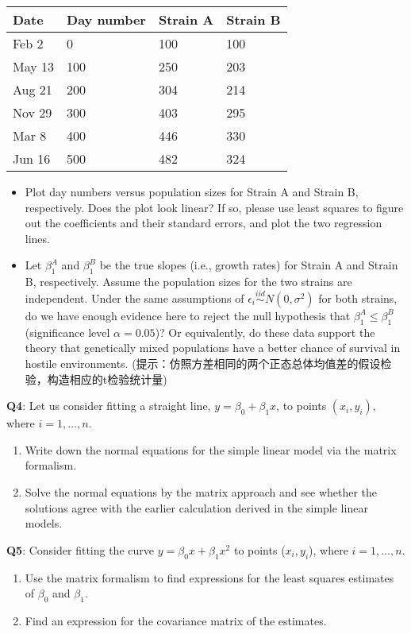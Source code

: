 \documentclass[]{article}
\begin{document}
\begin{longtable}[]{@{}llll@{}}
\toprule
Date & Day number & Strain A & Strain B\tabularnewline
\midrule
\endhead
Feb 2 & 0 & 100 & 100\tabularnewline
May 13 & 100 & 250 & 203\tabularnewline
Aug 21 & 200 & 304 & 214\tabularnewline
Nov 29 & 300 & 403 & 295\tabularnewline
Mar 8 & 400 & 446 & 330\tabularnewline
Jun 16 & 500 & 482 & 324\tabularnewline
\bottomrule
\end{longtable}

\begin{itemize}
\item
  Plot day numbers versus population sizes for Strain A and Strain B,
  respectively. Does the plot look linear? If so, please use least
  squares to figure out the coefficients and their standard errors, and
  plot the two regression lines.
\item
  Let \(\beta_1^A\) and \(\beta_1^B\) be the true slopes (i.e., growth
  rates) for Strain A and Strain B, respectively. Assume the population
  sizes for the two strains are independent. Under the same assumptions
  of \(\epsilon_i\stackrel{iid}{\sim} N(0,\sigma^2)\) for both strains,
  do we have enough evidence here to reject the null hypothesis that
  \(\beta_1^A\le \beta_1^B\) (significance level \(\alpha=0.05\))? Or
  equivalently, do these data support the theory that genetically mixed
  populations have a better chance of survival in hostile environments.
  (提示：仿照方差相同的两个正态总体均值差的假设检验，构造相应的t检验统计量)
\end{itemize}

\textbf{Q4}: Let us consider fitting a straight line,
\(y = \beta_0+\beta_1x\), to points \((x_i,y_i)\), where
\(i=1,\dots,n\).

\begin{enumerate}
\def\labelenumi{\arabic{enumi}.}
\item
  Write down the normal equations for the simple linear model via the
  matrix formalism.
\item
  Solve the normal equations by the matrix approach and see whether the
  solutions agree with the earlier calculation derived in the simple
  linear models.
\end{enumerate}

\textbf{Q5}: Consider fitting the curve \(y = \beta_0x+\beta_1x^2\) to
points (\(x_i,y_i\)), where \(i = 1,\dots,n\).

\begin{enumerate}
\def\labelenumi{\arabic{enumi}.}
\item
  Use the matrix formalism to find expressions for the least squares
  estimates of \(\beta_0\) and \(\beta_1\).
\item
  Find an expression for the covariance matrix of the estimates.
\end{enumerate}
\end{document}
